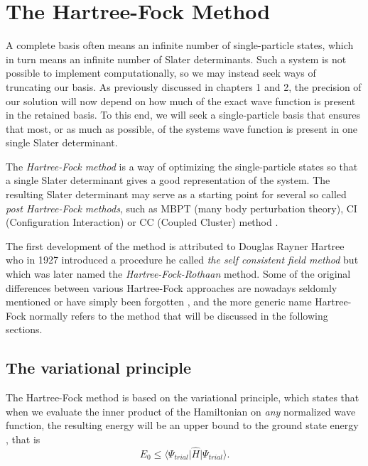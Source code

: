 \section{The Hartree-Fock Method}

A complete basis often means an infinite number of single-particle
states, which in turn means an infinite number of Slater
determinants. Such a system is not possible to implement
computationally, so we may instead seek ways of truncating our
basis. As previously discussed in chapters 1 and 2, the precision of
our solution will now depend on how much of the exact wave function is
present in the retained basis. To this end, we will seek a
single-particle basis that ensures that most, or as much as possible,  of the systems wave
function is present in one single Slater determinant.

The \emph{Hartree-Fock method} is a way of optimizing the
single-particle states so that a single Slater determinant gives a
good representation of the system. The resulting Slater determinant
may serve as a starting point for several so called \emph{post Hartree-Fock methods}, 
such as MBPT (many body perturbation theory),
CI (Configuration Interaction) or CC (Coupled Cluster)
method \cite{ShavittBartlett2009}.

The first development of the method is attributed to Douglas Rayner
Hartree who in 1927 introduced a procedure he called 
\emph{the self  consistent field method} \cite{Thijssen} but which was later named
the \emph{Hartree-Fock-Rothaan} method. Some of the original differences between various Hartree-Fock approaches 
are nowadays seldomly mentioned or have simply been forgotten \cite{ShavittBartlett2009},
and the more generic name Hartree-Fock normally refers to the method that will be discussed in
the following sections.

\subsection{The variational principle}

The Hartree-Fock method is based on the variational principle, which
states that when we evaluate the inner product of the Hamiltonian on
\emph{any} normalized wave function, the resulting energy will be an
upper bound to the ground state energy \cite{Griffiths2005},
that is
\begin{equation}
E_0 \leq \langle \Psi_{trial} \vert \hat{H} \vert \Psi_{trial} \rangle.
\label{eqn:variational}
\end{equation}

